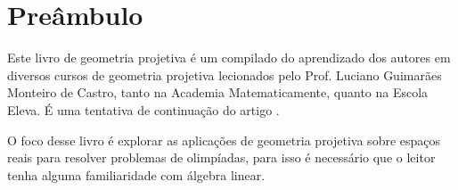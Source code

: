 \chapter*{Preâmbulo}

Este livro de geometria projetiva é um compilado do aprendizado dos autores em diversos cursos de geometria projetiva lecionados pelo Prof. Luciano Guimarães Monteiro de Castro, tanto na Academia Matematicamente, quanto na Escola Eleva. É uma tentativa de continuação do artigo \cite{castro2000}.

O foco desse livro é explorar as aplicações de geometria projetiva sobre espaços reais para resolver problemas de olimpíadas, para isso é necessário que o leitor tenha alguma familiaridade com álgebra linear.
